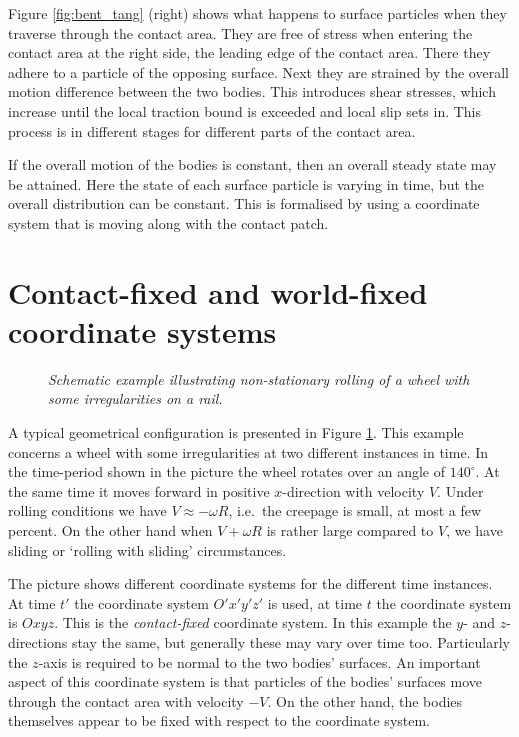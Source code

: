 \documentclass[12pt]{report}
\begin{document}
Figure \ref{fig:bent_tang} (right) shows what happens to surface particles
when they traverse through the contact area. They are free of stress when
entering the contact area at the right side, the leading edge of the
contact area. There they adhere to a particle of the opposing surface. Next
they are strained by the overall motion difference between the two bodies.
This introduces shear stresses, which increase until the local traction
bound is exceeded and local slip sets in. This process is in different
stages for different parts of the contact area.

If the overall motion of the bodies is constant, then an overall steady
state may be attained. Here the state of each surface particle is varying
in time, but the overall distribution can be constant. This is formalised
by using a coordinate system that is moving along with the contact patch.

\section{Contact-fixed and world-fixed coordinate systems}
\label{sec:coordsys}

\begin{figure}[bt]
\centering
{}
\caption{\em Schematic example illustrating non-stationary rolling of a
wheel with some irregularities on a rail.}
\label{fig:moving_coordsys}
\end{figure}

A typical geometrical configuration is presented in Figure
\ref{fig:moving_coordsys}. This example concerns a wheel with some
irregularities at two different instances in time. In the time-period shown
in the picture the wheel rotates over an angle of $140^\circ$. At the same
time it moves forward in positive $x$-direction with velocity $V$. Under
rolling conditions we have $V\approx -\omega R$, i.e.\ the creepage is
small, at most a few percent. On the other hand when $V+\omega R$ is
rather large compared to $V$, we have sliding or `rolling with sliding'
circumstances.

The picture shows different coordinate systems for the different time
instances. At time $t'$ the coordinate system $O'x'y'z'$ is used, at time $t$
the coordinate system is $Oxyz$. This is the {\em contact-fixed\/}
coordinate system. In this example the $y$- and $z$-directions stay the same,
but generally these may vary over time too. Particularly the $z$-axis is
required to be normal to the two bodies' surfaces. An important aspect of
this coordinate system is that particles of the bodies' surfaces move
through the contact area with velocity $-V$. On the other hand, the
bodies themselves appear to be fixed with respect to the coordinate system.
\end{document}
